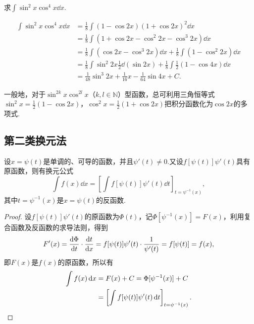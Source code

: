 \begin{example}
求\(\int \sin^2 x \cos^4 x \dd{x}\).
\begin{solution}
\begin{align*}
\int \sin^2 x \cos^4 x \dd{x}
&= \frac{1}{8} \int (1 - \cos 2x) (1 + \cos 2x)^2 \dd{x} \\
&= \frac{1}{8} \int (1 + \cos 2x - \cos^2 2x - \cos^3 2x) \dd{x} \\
&= \frac{1}{8} \int (\cos 2x - \cos^3 2x) \dd{x}
	+ \frac{1}{8} \int (1 - \cos^2 2x) \dd{x} \\
&= \frac{1}{8} \int \sin^2 2x \frac{1}{2} \dd(\sin 2x)
	+ \frac{1}{8} \int \frac{1}{2} (1 - \cos 4x) \dd{x} \\
&= \frac{1}{48} \sin^3 2x + \frac{1}{16} x - \frac{1}{64} \sin 4x + C.
\end{align*}
\end{solution}
\end{example}

一般地，对于\(\sin^{2k} x \cos^{2l} x\)（\(k,l\in\mathbb{N}\)）型函数，总可利用三角恒等式\(\sin^2 x = \frac{1}{2} (1 - \cos 2x)\)，\(\cos^2 x = \frac{1}{2} (1 + \cos 2x)\)把积分函数化为\(\cos 2x\)的多项式.

\subsection{第二类换元法}

\begin{theorem}
设\(x = \psi(t)\)是单调的、可导的函数，并且\(\psi'(t) \neq 0\).又设\(f[\psi(t)] \psi'(t)\)具有原函数，则有换元公式\[
\int f(x) \dd{x} = \left[ \int f[\psi(t)] \psi'(t) \dd{t} \right]_{t=\psi^{-1}(x)},
\]其中\(t=\psi^{-1}(x)\)是\(x=\psi(t)\)的反函数.
\begin{proof}
设\(f[\psi(t)] \psi'(t)\)的原函数为\(\Phi(t)\)，记\(\Phi[\psi^{-1}(x)] = F(x)\)，利用复合函数及反函数的求导法则，得到\[
F'(x) = \dv{\Phi}{t} \cdot \dv{t}{x}
= f[\psi(t)] \psi'(t) \cdot \frac{1}{\psi'(t)}
= f[\psi(t)] = f(x),
\]即\(F(x)\)是\(f(x)\)的原函数，所以有\begin{align*}
\int f(x) \dd{x} &= F(x) + C
= \Phi[\psi^{-1}(x)] + C \\
&= \left[ \int f[\psi(t)] \psi'(t) \dd{t} \right]_{t=\psi^{-1}(x)}.
\qedhere
\end{align*}
\end{proof}
\end{theorem}

